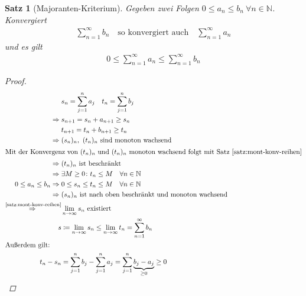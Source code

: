 \documentclass[11pt, twoside, a4paper]{article}
\theoremstyle{plain}
\newtheorem{satz}[blockelement]{Satz}
\newcommand{\impl}[0]{\Rightarrow{}}
\newcommand{\fromto}{\rightarrow{}}
\newcommand{\definedas}[0]{\coloneqq}
\newcommand{\annot}[3][]{\overset{\text{#3}}#1{#2}}
\newcommand{\N}{\mathbb{N}}
\begin{document}
    \begin{satz}[Majoranten-Kriterium] %
        \label{satz:majoranten-kriterium}
        Gegeben zwei Folgen $0\leq a_n \leq b_n~\forall n\in\N$. Konvergiert
        \begin{align*}
            \sum_{n=1}^{\infty} b_n\quad\text{so konvergiert auch}\quad\sum_{n=1}^{\infty} a_n
        \end{align*}
        und es gilt
        \begin{align*}
            0\leq \sum_{n=1}^{\infty} a_n \leq \sum_{n=1}^{\infty} b_n
        \end{align*}
        \begin{proof}
            \begin{align*}
                &s_n = \sum_{j=1}^{n} a_j\quad t_n = \sum_{j=1}^{n} b_j\\
                \impl &s_{n+1} = s_n + a_{n+1} \geq s_n\\
                &t_{n+1} = t_n + b_{n+1} \geq t_n\\
                \impl &(s_n)_n,~(t_n)_n\text{ sind monoton wachsend}\\
                \intertext{Mit der Konvergenz von $(t_n)_n$ und $(t_n)_n$ monoton wachsend folgt mit Satz~\ref{satz:mont-konv-reihen}}
                \impl &(t_n)_n\text{ ist beschränkt}\\
                \impl &\exists M\geq 0\colon t_n \leq M\quad\forall n\in\N\\
                0\leq a_n \leq b_n \impl &0\leq s_n \leq t_n \leq M \quad\forall n\in\N\\
                \impl &(s_n)_n\text{ ist nach oben beschränkt und monoton wachsend}\\
                \annot{\impl}{\ref{satz:mont-konv-reihen}} &\lim_{n\fromto\infty} s_n\text{ existiert }\\
                \quad s &\definedas \lim_{n\fromto\infty} s_n \leq \lim_{n\fromto\infty} t_n = \sum_{n=1}^{\infty} b_n\qedhere\\
                \intertext{Außerdem gilt:}
                t_n - s_n &= \sum_{j=1}^{n} b_j - \sum_{j=1}^{n} a_j = \sum_{j=1}^{n} \underbrace{b_j-a_j}_{\geq 0} \geq 0
            \end{align*}
        \end{proof}
    \end{satz}
\end{document}
